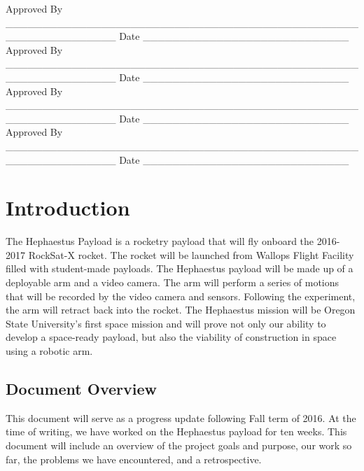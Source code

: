 \documentclass[letterpaper,10pt]{article}
\newenvironment{bottompar}{\par\vspace*{\fill}}{\clearpage}
\begin{document}
\begin{bottompar}
Approved By
\_\_\_\_\_\_\_\_\_\_\_\_\_\_\_\_\_\_\_\_\_\_\_\_\_\_\_\_\_\_\_\_\_\_\_\_\_\_\_\_\_\_\_\_\_\_\_\_\_\_\_\_\_\_\_\_\_\_\_\_\_\_\_
Date \_\_\_\_\_\_\_\_\_\_\_\_\_\_\_\_\_\_\_\_\_\_\_\_\_\_\_\_ \\


Approved By
\_\_\_\_\_\_\_\_\_\_\_\_\_\_\_\_\_\_\_\_\_\_\_\_\_\_\_\_\_\_\_\_\_\_\_\_\_\_\_\_\_\_\_\_\_\_\_\_\_\_\_\_\_\_\_\_\_\_\_\_\_\_\_
Date \_\_\_\_\_\_\_\_\_\_\_\_\_\_\_\_\_\_\_\_\_\_\_\_\_\_\_\_ \\


Approved By
\_\_\_\_\_\_\_\_\_\_\_\_\_\_\_\_\_\_\_\_\_\_\_\_\_\_\_\_\_\_\_\_\_\_\_\_\_\_\_\_\_\_\_\_\_\_\_\_\_\_\_\_\_\_\_\_\_\_\_\_\_\_\_
Date \_\_\_\_\_\_\_\_\_\_\_\_\_\_\_\_\_\_\_\_\_\_\_\_\_\_\_\_ \\


Approved By
\_\_\_\_\_\_\_\_\_\_\_\_\_\_\_\_\_\_\_\_\_\_\_\_\_\_\_\_\_\_\_\_\_\_\_\_\_\_\_\_\_\_\_\_\_\_\_\_\_\_\_\_\_\_\_\_\_\_\_\_\_\_\_
Date \_\_\_\_\_\_\_\_\_\_\_\_\_\_\_\_\_\_\_\_\_\_\_\_\_\_\_\_ \\
\end{bottompar}

\clearpage
\tableofcontents
\clearpage

\section{Introduction}
The Hephaestus Payload is a rocketry \gls{payload} that will fly onboard the 2016-2017 RockSat-X rocket. 
The rocket will be launched from Wallops Flight Facility filled with
student-made \glspl{payload}. 
The Hephaestus \gls{payload} will be made up of a \gls{deployable} arm and a video camera. The arm will perform 
a series of motions that will be recorded by the video camera and sensors. Following the experiment, the 
arm will retract back into the rocket. The Hephaestus mission will be Oregon State University's first 
space mission and will prove not only our ability to develop a space-ready
\gls{payload}, but also the 
viability of construction in space using a robotic arm.

\subsection{Document Overview}
This document will serve as a progress update following Fall term of 2016. At the time of writing, we 
have worked on the Hephaestus \gls{payload} for ten weeks. This document will include an overview of the 
project goals and purpose, our work so far, the problems we have encountered, and a retrospective.
\end{document}
